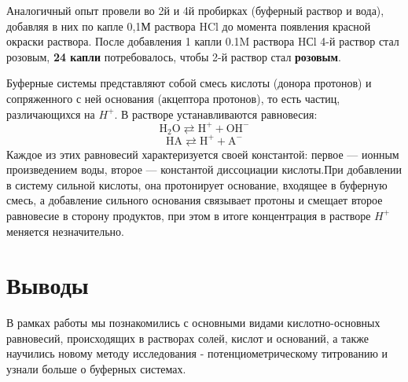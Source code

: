 \documentclass[a4paper,12pt]{article}
\begin{document}
Аналогичный опыт провели во 2й и 4й пробирках (буферный раствор и вода),
добавляя в них по капле 0,1М раствора HCl до момента появления красной окраски
раствора. После добавления 1 капли 0.1M раствора HСl 4-й раствор стал розовым, \textbf{24 капли} потребовалось, чтобы 2-й раствор стал \textbf{розовым}.

Буферные системы представляют собой смесь кислоты (донора протонов) и сопряженного с ней основания (акцептора протонов), то есть частиц, различающихся на $H^+$. В растворе устанавливаются равновесия:
\begin{equation}
\mathrm{H_2O \rightleftarrows H^+ + OH^-}
\end{equation}
\begin{equation}
\mathrm{HA \rightleftarrows H^+ + A^-}
\end{equation}
Каждое из этих равновесий характеризуется своей константой: первое — ионным произведением воды, второе — константой диссоциации кислоты.При добавлении в систему сильной кислоты, она протонирует основание, входящее в буферную смесь, а добавление сильного основания связывает протоны и смещает второе равновесие в сторону продуктов, при этом в итоге концентрация  в растворе $H^+$ меняется незначительно.
\section{Выводы}
В рамках работы мы познакомились с основными видами кислотно-основных равновесий, происходящих в растворах солей, кислот и оснований, а также научились новому методу исследования - потенциометрическому титрованию и узнали больше о буферных системах.
\end{document}
